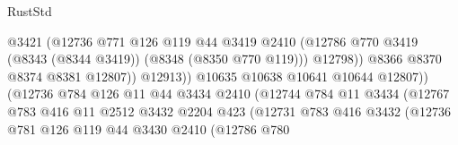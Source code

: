 \begin{lexlean}{RustStd}
\begin{coremodule}
{\begin{coremodule}
{{{{{{{{{{{{{{{{{{{{{{{{{{{{{{{{{{{{{{{{{{{{{{{{{{                                            @3421
                                            (@12736
                                              @771
                                              @126
                                              @119
                                              @44
                                              @3419
                                              @2410
                                              (@12786
                                                @770
                                                @3419
                                                (@8343 (@8344 @3419))
                                                (@8348 (@8350 @770 @119)))
                                              @12798))
                                          @8366
                                          @8370
                                          @8374
                                          @8381
                                          @12807))
                                      @12913))
                                  @10635
                                  @10638
                                  @10641
                                  @10644
                                  @12807))
                              (@12736
                                @784
                                @126
                                @11
                                @44
                                @3434
                                @2410
                                (@12744
                                  @784
                                  @11
                                  @3434
                                  (@12767
                                    @783
                                    @416
                                    @11
                                    @2512
                                    @3432
                                    @2204
                                    @423
                                    (@12731
                                      @783
                                      @416
                                      @3432
                                      (@12736
                                        @781
                                        @126
                                        @119
                                        @44
                                        @3430
                                        @2410
                                        (@12786
                                          @780
}}}}}}}}}}}}}}}}}}}}}}}}}}}}}}}}}}}}}}}}}}}}}}}}}}
\end{coremodule}}
\end{coremodule}
\end{lexlean}
